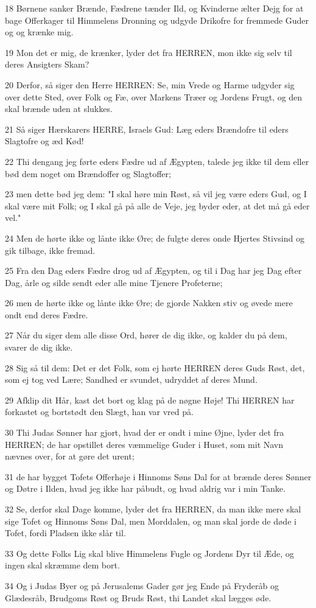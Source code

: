 \par 18 Børnene sanker Brænde, Fædrene tænder Ild, og Kvinderne ælter Dejg for at bage Offerkager til Himmelens Dronning og udgyde Drikofre for fremmede Guder og og krænke mig.
\par 19 Mon det er mig, de krænker, lyder det fra HERREN, mon ikke sig selv til deres Ansigters Skam?
\par 20 Derfor, så siger den Herre HERREN: Se, min Vrede og Harme udgyder sig over dette Sted, over Folk og Fæ, over Markens Træer og Jordens Frugt, og den skal brænde uden at slukkes.
\par 21 Så siger Hærskarers HERRE, Israels Gud: Læg eders Brændofre til eders Slagtofre og æd Kød!
\par 22 Thi dengang jeg førte eders Fædre ud af Ægypten, talede jeg ikke til dem eller bød dem noget om Brændoffer og Slagtoffer;
\par 23 men dette bød jeg dem: "I skal høre min Røst, så vil jeg være eders Gud, og I skal være mit Folk; og I skal gå på alle de Veje, jeg byder eder, at det må gå eder vel."
\par 24 Men de hørte ikke og lånte ikke Øre; de fulgte deres onde Hjertes Stivsind og gik tilbage, ikke fremad.
\par 25 Fra den Dag eders Fædre drog ud af Ægypten, og til i Dag har jeg Dag efter Dag, årle og silde sendt eder alle mine Tjenere Profeterne;
\par 26 men de hørte ikke og lånte ikke Øre; de gjorde Nakken stiv og øvede mere ondt end deres Fædre.
\par 27 Når du siger dem alle disse Ord, hører de dig ikke, og kalder du på dem, svarer de dig ikke.
\par 28 Sig så til dem: Det er det Folk, som ej hørte HERREN deres Guds Røst, det, som ej tog ved Lære; Sandhed er svundet, udryddet af deres Mund.
\par 29 Afklip dit Hår, kast det bort og klag på de nøgne Høje! Thi HERREN har forkastet og bortstødt den Slægt, han var vred på.
\par 30 Thi Judas Sønner har gjort, hvad der er ondt i mine Øjne, lyder det fra HERREN; de har opstillet deres væmmelige Guder i Huset, som mit Navn nævnes over, for at gøre det urent;
\par 31 de har bygget Tofets Offerhøje i Hinnoms Søns Dal for at brænde deres Sønner og Døtre i Ilden, hvad jeg ikke har påbudt, og hvad aldrig var i min Tanke.
\par 32 Se, derfor skal Dage komme, lyder det fra HERREN, da man ikke mere skal sige Tofet og Hinnoms Søns Dal, men Morddalen, og man skal jorde de døde i Tofet, fordi Pladsen ikke slår til.
\par 33 Og dette Folks Lig skal blive Himmelens Fugle og Jordens Dyr til Æde, og ingen skal skræmme dem bort.
\par 34 Og i Judas Byer og på Jerusalems Gader gør jeg Ende på Fryderåb og Glædesråb, Brudgoms Røst og Bruds Røst, thi Landet skal lægges øde.

